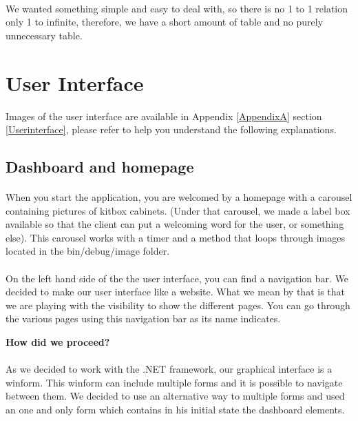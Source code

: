 \documentclass[12pt,oneside]{report}
\begin{document}
        \paragraph{}
        We wanted something simple and easy to deal with, so there is no 1 to 1 relation only 1 to infinite, therefore, we have a short amount of table and no purely unnecessary table.
        
\newpage
\section{User Interface}
Images of the user interface are available in Appendix \ref{AppendixA} section \ref{Userinterface}, please refer to help you understand the following explanations. 
    \subsection{Dashboard and homepage}
        \paragraph{}
        When you start the application, you are welcomed by a homepage with a carousel containing pictures of kitbox cabinets. (Under that carousel, we made a label box available so that the client can put a welcoming word for the user, or something else). This carousel works with a timer and a method that loops through images located in the bin/debug/image folder.
        
        \paragraph{}
        On the left hand side of the the user interface, you can find a navigation bar. We decided to make our user interface like a website. What we mean by that is that we are playing with the visibility to show the different pages. You can go through the various pages using this navigation bar as its name indicates. 
        
        \vspace{\baselineskip}

        \textbf{How did we proceed?}
        
        \paragraph{}
        As we decided to work with the .NET framework, our graphical interface is a winform. This winform can include multiple forms and it is possible to navigate between them. We decided to use an alternative way to multiple forms and used an one and only form which contains in his initial state the dashboard elements.
        
\end{document}
